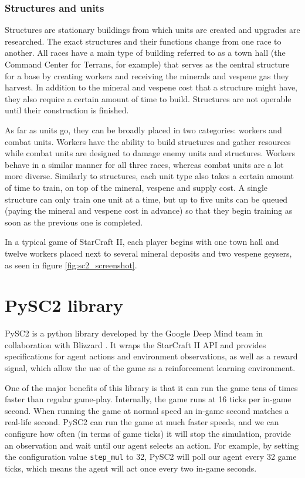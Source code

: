 \subsubsection{Structures and units}

Structures are stationary buildings from which units are created and upgrades are researched. The exact structures and their functions change from one race to another. All races have a main type of building referred to as a town hall (the Command Center for Terrans, for example) that serves as the central structure for a base by creating workers and receiving the minerals and vespene gas they harvest. In addition to the mineral and vespene cost that a structure might have, they also require a certain amount of time to build. Structures are not operable until their construction is finished.

As far as units go, they can be broadly placed in two categories: workers and combat units. Workers have the ability to build structures and gather resources while combat units are designed to damage enemy units and structures. Workers behave in a similar manner for all three races, whereas combat units are a lot more diverse. Similarly to structures, each unit type also takes a certain amount of time to train, on top of the mineral, vespene and supply cost. A single structure can only train one unit at a time, but up to five units can be queued (paying the mineral and vespene cost in advance) so that they begin training as soon as the previous one is completed.

In a typical game of StarCraft II, each player begins with one town hall and twelve workers placed next to several mineral deposits and two vespene geysers, as seen in figure \ref{fig:sc2_screenshot}.

\section{PySC2 library}

PySC2 is a python library developed by the Google Deep Mind team in collaboration with Blizzard \cite{Vinyals:2017}. It wraps the StarCraft II API and provides specifications for agent actions and environment observations, as well as a reward signal, which allow the use of the game as a reinforcement learning environment.

One of the major benefits of this library is that it can run the game tens of times faster than regular game-play. Internally, the game runs at 16 ticks per in-game second. When running the game at normal speed an in-game second matches a real-life second. PySC2 can run the game at much faster speeds, and we can configure how often (in terms of game ticks) it will stop the simulation, provide an observation and wait until our agent selects an action. For example, by setting the configuration value \texttt{step\_mul} to 32, PySC2 will poll our agent every 32 game ticks, which means the agent will act once every two in-game seconds.

